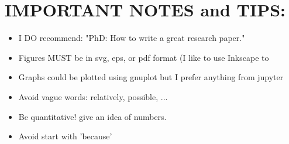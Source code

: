 \newpage\newpage
\section*{IMPORTANT NOTES and TIPS:}

\begin{itemize}
	\item I DO recommend: "PhD: How to write a great research paper." %
	\item Figures MUST be in svg, eps, or pdf format (I like to use Inkscape to %
	\item Graphs could be plotted using gnuplot but I prefer anything from jupyter %
	\item Avoid vague words: relatively, possible, ... 
	\item Be quantitative! give an idea of numbers.
	\item Avoid start with 'because'

\end{itemize}
